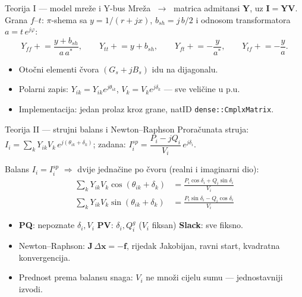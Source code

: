\documentclass[11pt,aspectratio=169]{beamer}
\begin{document}
\begin{frame}{Teorija I --- model mreže i Y-bus}
  Mreža $\;\rightarrow\;$ matrica admitansi $\mathbf{Y}$, uz
  $\mathbf{I}=\mathbf{Y}\mathbf{V}$. Grana $f$--$t$: $\pi$-shema sa
  $y=1/(r+jx)$, $b_{sh}=j\,b/2$ i odnosom transformatora $a=t\,e^{j\varphi}$:
  \begin{equation*}
    Y_{ff}\mathrel{+}=\frac{y+b_{sh}}{a\,a^{*}},\qquad
    Y_{tt}\mathrel{+}=y+b_{sh},\qquad
    Y_{ft}\mathrel{+}=-\frac{y}{a^{*}},\qquad
    Y_{tf}\mathrel{+}=-\frac{y}{a}.
  \end{equation*}
  \begin{itemize}
    \item Otočni elementi čvora $(G_s+jB_s)$ idu na dijagonalu.
    \item Polarni zapis: $Y_{ik}=Y_{ik}e^{j\theta_{ik}}$,
          $V_k=V_k e^{j\delta_k}$ --- sve veličine u p.u.
    \item Implementacija: jedan prolaz kroz grane, natID
          \texttt{dense::CmplxMatrix}.
  \end{itemize}
\end{frame}

\begin{frame}{Teorija II --- strujni balans i Newton--Raphson}
  Proračunata struja: $I_i = \sum_k Y_{ik}V_k\,e^{j(\theta_{ik}+\delta_k)}$;
  \quad zadana: $I_i^{sp}=\dfrac{P_i-jQ_i}{V_i}\,e^{j\delta_i}$.

  \vspace{1mm}
  Balans $I_i = I_i^{sp}$ $\Rightarrow$ dvije jednačine po čvoru
  (realni i imaginarni dio):
  \begin{align*}
    \sum_k Y_{ik}V_k\cos(\theta_{ik}+\delta_k) &=
      \frac{P_i\cos\delta_i + Q_i\sin\delta_i}{V_i}\\[-1mm]
    \sum_k Y_{ik}V_k\sin(\theta_{ik}+\delta_k) &=
      \frac{P_i\sin\delta_i - Q_i\cos\delta_i}{V_i}
  \end{align*}
  \begin{itemize}
    \item \textbf{PQ}: nepoznate $\delta_i, V_i$ \quad
          \textbf{PV}: $\delta_i, Q_i^g$ ($V_i$ fiksan) \quad
          \textbf{Slack}: sve fiksno.
    \item Newton--Raphson: $\mathbf{J}\,\Delta\mathbf{x}=-\mathbf{f}$,
          rijedak Jakobijan, ravni start, \alert{kvadratna konvergencija}.
    \item Prednost prema balansu snaga: $V_i$ ne množi cijelu sumu ---
          jednostavniji izvodi.
  \end{itemize}
\end{frame}
\end{document}
